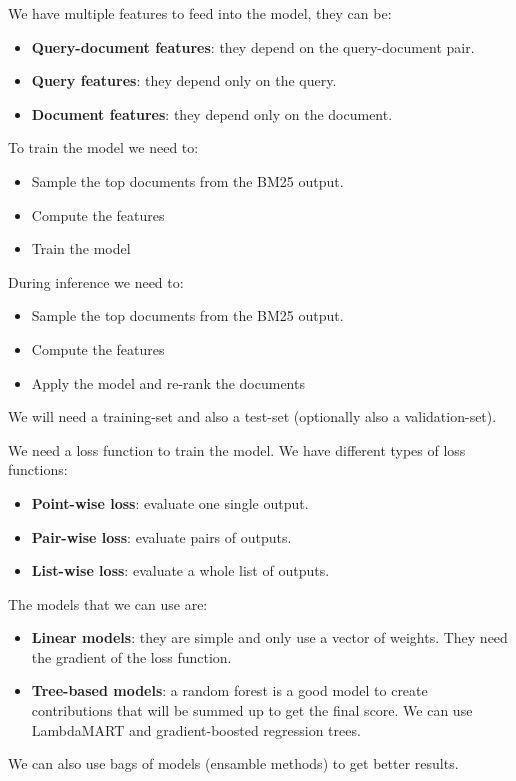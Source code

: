 We have multiple features to feed into the model, they can be:
\begin{itemize}
    \item \textbf{Query-document features}: they depend on the
    query-document pair.
    \item \textbf{Query features}: they depend only on the query.
    \item \textbf{Document features}: they depend only on the
    document.
\end{itemize}

To train the model we need to:
\begin{itemize}
    \item Sample the top documents from the BM25 output.
    \item Compute the features
    \item Train the model
\end{itemize}

During inference we need to:
\begin{itemize}
    \item Sample the top documents from the BM25 output.
    \item Compute the features
    \item Apply the model and re-rank the documents
\end{itemize}

We will need a training-set and also a test-set
(optionally also a validation-set).

We need a loss function to train the model.
We have different types of loss functions:
\begin{itemize}
    \item \textbf{Point-wise loss}: evaluate one single output.
    \item \textbf{Pair-wise loss}: evaluate pairs of outputs.
    \item \textbf{List-wise loss}: evaluate a whole list of
    outputs.
\end{itemize}

The models that we can use are:
\begin{itemize}
    \item \textbf{Linear models}: they are simple and only use
    a vector of weights. They need the gradient of the loss
    function.
    \item \textbf{Tree-based models}: a random forest is a good
    model to create contributions that will be summed up to
    get the final score. We can use LambdaMART and gradient-boosted
    regression trees.
\end{itemize}

We can also use bags of models (ensamble methods) to get better
results.